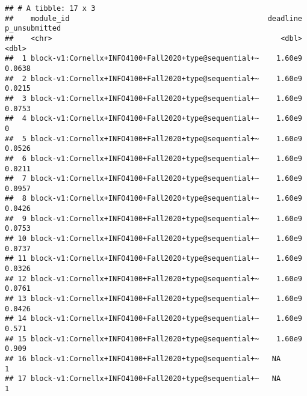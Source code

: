 \documentclass[
]{article}
\newenvironment{Shaded}{\begin{snugshade}}{\end{snugshade}}
\newcommand{\DataTypeTok}[1]{\textcolor[rgb]{0.13,0.29,0.53}{#1}}
\newcommand{\DecValTok}[1]{\textcolor[rgb]{0.00,0.00,0.81}{#1}}
\newcommand{\FloatTok}[1]{\textcolor[rgb]{0.00,0.00,0.81}{#1}}
\newcommand{\KeywordTok}[1]{\textcolor[rgb]{0.13,0.29,0.53}{\textbf{#1}}}
\newcommand{\NormalTok}[1]{#1}
\newcommand{\OperatorTok}[1]{\textcolor[rgb]{0.81,0.36,0.00}{\textbf{#1}}}
\newcommand{\StringTok}[1]{\textcolor[rgb]{0.31,0.60,0.02}{#1}}
\begin{document}
\begin{verbatim}
## # A tibble: 17 x 3
##    module_id                                              deadline p_unsubmitted
##    <chr>                                                     <dbl>         <dbl>
##  1 block-v1:Cornellx+INFO4100+Fall2020+type@sequential+~    1.60e9        0.0638
##  2 block-v1:Cornellx+INFO4100+Fall2020+type@sequential+~    1.60e9        0.0215
##  3 block-v1:Cornellx+INFO4100+Fall2020+type@sequential+~    1.60e9        0.0753
##  4 block-v1:Cornellx+INFO4100+Fall2020+type@sequential+~    1.60e9        0     
##  5 block-v1:Cornellx+INFO4100+Fall2020+type@sequential+~    1.60e9        0.0526
##  6 block-v1:Cornellx+INFO4100+Fall2020+type@sequential+~    1.60e9        0.0211
##  7 block-v1:Cornellx+INFO4100+Fall2020+type@sequential+~    1.60e9        0.0957
##  8 block-v1:Cornellx+INFO4100+Fall2020+type@sequential+~    1.60e9        0.0426
##  9 block-v1:Cornellx+INFO4100+Fall2020+type@sequential+~    1.60e9        0.0753
## 10 block-v1:Cornellx+INFO4100+Fall2020+type@sequential+~    1.60e9        0.0737
## 11 block-v1:Cornellx+INFO4100+Fall2020+type@sequential+~    1.60e9        0.0326
## 12 block-v1:Cornellx+INFO4100+Fall2020+type@sequential+~    1.60e9        0.0761
## 13 block-v1:Cornellx+INFO4100+Fall2020+type@sequential+~    1.60e9        0.0426
## 14 block-v1:Cornellx+INFO4100+Fall2020+type@sequential+~    1.60e9        0.571 
## 15 block-v1:Cornellx+INFO4100+Fall2020+type@sequential+~    1.60e9        0.909 
## 16 block-v1:Cornellx+INFO4100+Fall2020+type@sequential+~   NA             1     
## 17 block-v1:Cornellx+INFO4100+Fall2020+type@sequential+~   NA             1
\end{verbatim}

\begin{Shaded}
\end{Shaded}
\end{document}

